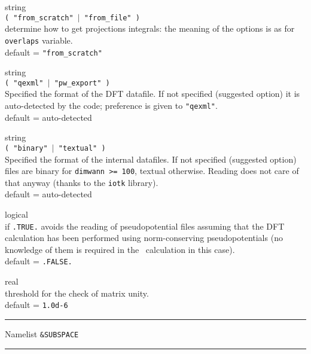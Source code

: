 {\noindent{}%
{\sc string} \\ {\tt ( "from\_scratch" $\mid$ "from\_file" ) }\\
determine how to get projections integrals:
the meaning of the options is as for {\tt overlaps} variable.\\
{\sc default} = {\tt "from\_scratch"} \par

\noindent{}%
{\sc string} \\ {\tt ( "qexml" $\mid$ "pw\_export" ) }\\
Specified the format of the DFT datafile. If not specified (suggested option)
it is auto-detected by the code; preference is given to {\tt "qexml"}. \\
{\sc default} = auto-detected \par

\noindent{}%
{\sc string} \\ {\tt ( "binary" $\mid$ "textual" ) }\\
Specified the format of the \WANT{} internal datafiles. If not specified (suggested option)
files are binary for {\tt dimwann >= 100}, textual otherwise. Reading
does not care of that anyway (thanks to the {\tt iotk} library).  \\
{\sc default} = auto-detected \par

\noindent{}%
{\sc logical} \\ if {\tt .TRUE.} avoids the reading of pseudopotential files
assuming that the DFT calculation has been performed using norm-conserving
pseudopotentials (no knowledge of them is required in the \WANT\ calculation
in this case).\\
{\sc default} = {\tt .FALSE.} \par

\noindent{}%
{\sc real} \\ threshold for the check of matrix unity.\\
{\sc default} = {\tt 1.0d-6} \par
}\bigskip

\begin{centering}
\rule{2.2in}{0.01in} Namelist {\tt \&SUBSPACE} \rule{2.2in}{0.01in}
\end{centering}\\


